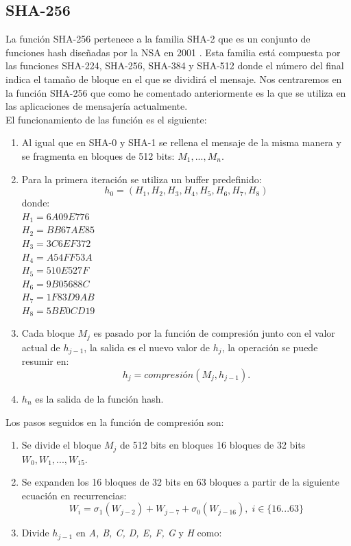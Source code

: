 \begin{aligned*}
\subsection{SHA-256}
La función SHA-256 pertenece a la familia SHA-2 que es un conjunto de funciones hash diseñadas por la NSA en 2001 \cite{Penard2008}. Esta familia está compuesta por las funciones SHA-224, SHA-256, SHA-384 y SHA-512 donde el número del final indica el tamaño de bloque en el que se dividirá el mensaje. Nos centraremos en la función SHA-256 que como he comentado anteriormente es la que se utiliza en las aplicaciones de mensajería actualmente.\\
El funcionamiento de las función es el siguiente\cite{Function2016}:\\
\begin{enumerate}
	\item Al igual que en SHA-0 y SHA-1 se rellena el mensaje de la misma manera y se fragmenta en bloques de 512 bits: $M_1,...,M_n$.
	\item Para la primera iteración se utiliza un buffer predefinido:
	$$
		h_0=(H_1, H_2, H_3, H_4, H_5, H_6, H_7, H_8)
	$$
	donde:\\
	$H_1=6A09E776$\\
	$H_2=BB67AE85$\\
	$H_3=3C6EF372$\\
	$H_4=A54FF53A$\\
	$H_5=510E527F$\\
	$H_6=9B05688C$\\
	$H_7=1F83D9AB$\\
	$H_8=5BE0CD19$\\
	\item Cada bloque $M_j$ es pasado por la función de compresión junto con el valor actual de $h_{j-1}$, la salida es el nuevo valor de $h_j$, la operación se puede resumir en:
	$$
		h_j=compresión(M_j,h_{j-1}).
	$$
	\item $h_n$ es la salida de la función hash.
\end{enumerate}
Los pasos seguidos en la función de compresión son:
\begin{enumerate}
	\item Se divide el bloque $M_j$ de 512 bits en bloques 16 bloques de 32 bits $W_0,W_1,...,W_{15}$. 
	\item Se expanden los 16 bloques de 32 bits en 63 bloques a partir de la siguiente ecuación en recurrencias:
	$$
		W_i=\sigma_1(W_{j-2})+W_{j-7}+\sigma_0(W_{j-16}),\; i \in \{16...63\}
	$$
	\item Divide $h_{j-1}$ en \emph{A, B, C, D, E, F, G} y \emph{H} como:

\end{enumerate}
\end{aligned*}
